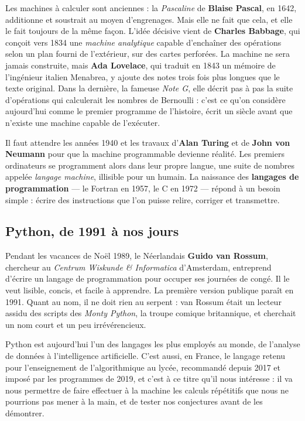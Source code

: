 \documentclass[a4paper,11pt,openany]{book}
\newcommand{\mot}[1]{\textcolor{rougecours}{\textbf{#1}}}
\begin{document}
Les machines à calculer sont anciennes : la \emph{Pascaline} de \textbf{Blaise Pascal}, en 1642, additionne et soustrait au moyen d'engrenages. Mais elle ne fait que cela, et elle le fait toujours de la même façon. L'idée décisive vient de \textbf{Charles Babbage}, qui conçoit vers 1834 une \emph{machine analytique} capable d'enchaîner des opérations selon un plan fourni de l'extérieur, sur des cartes perforées. La machine ne sera jamais construite, mais \textbf{Ada Lovelace}, qui traduit en 1843 un mémoire de l'ingénieur italien Menabrea, y ajoute des notes trois fois plus longues que le texte original. Dans la dernière, la fameuse \emph{Note G}, elle décrit pas à pas la suite d'opérations qui calculerait les nombres de Bernoulli : c'est ce qu'on considère aujourd'hui comme le premier programme de l'histoire, écrit un siècle avant que n'existe une machine capable de l'exécuter.

Il faut attendre les années 1940 et les travaux d'\textbf{Alan Turing} et de \textbf{John von Neumann} pour que la machine programmable devienne réalité. Les premiers ordinateurs se programment alors dans leur propre langue, une suite de nombres appelée \emph{langage machine}, illisible pour un humain. La naissance des \mot{langages de programmation} — le Fortran en 1957, le C en 1972 — répond à un besoin simple : écrire des instructions que l'on puisse relire, corriger et transmettre.

\subsection{Python, de 1991 à nos jours}

Pendant les vacances de Noël 1989, le Néerlandais \textbf{Guido van Rossum}, chercheur au \emph{Centrum Wiskunde \& Informatica} d'Amsterdam, entreprend d'écrire un langage de programmation pour occuper ses journées de congé. Il le veut lisible, concis, et facile à apprendre. La première version publique paraît en 1991. Quant au nom, il ne doit rien au serpent : van Rossum était un lecteur assidu des scripts des \emph{Monty Python}, la troupe comique britannique, et cherchait un nom court et un peu irrévérencieux.

Python est aujourd'hui l'un des langages les plus employés au monde, de l'analyse de données à l'intelligence artificielle. C'est aussi, en France, le langage retenu pour l'enseignement de l'algorithmique au lycée, recommandé depuis 2017 et imposé par les programmes de 2019, et c'est à ce titre qu'il nous intéresse : il va nous permettre de faire effectuer à la machine les calculs répétitifs que nous ne pourrions pas mener à la main, et de tester nos conjectures avant de les démontrer.
\end{document}
